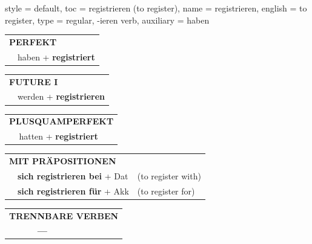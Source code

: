 \begin{verbentry}{
  style = {default},
  toc = {registrieren (to register)},
  name = {registrieren},
  english = {to register},
  type = {regular, -ieren verb},
  auxiliary = {haben}
}
 \begin{tabular}{rl}
     \multicolumn{2}{l}{\textbf{PERFEKT}}\\
   & haben + \textbf{registriert}\\
  \end{tabular}
\hfill
   \begin{tabular}{rl}
    \multicolumn{2}{l}{\textbf{FUTURE I} }\\
   & werden + \textbf{registrieren}\\
  \end{tabular}
\hfill
   \begin{tabular}{rl}
      \multicolumn{2}{l}{\textbf{PLUSQUAMPERFEKT}}\\
   & hatten + \textbf{registriert}\\
  \end{tabular}

   \vspace{10pt}

   \begin{tabular}{lll}
      \multicolumn{3}{l}{\textbf{MIT PRÄPOSITIONEN}}\\
& \textbf{sich registrieren bei} + Dat & (to register with)\\
& \textbf{sich registrieren für} + Akk & (to register for)\\
\end{tabular}
  \hfill
   \begin{tabular}{lll}
\multicolumn{3}{l}{\textbf{TRENNBARE VERBEN}}\\
& \textbf{---} & \\
\end{tabular}

  \vspace{-5pt}
\end{verbentry}

